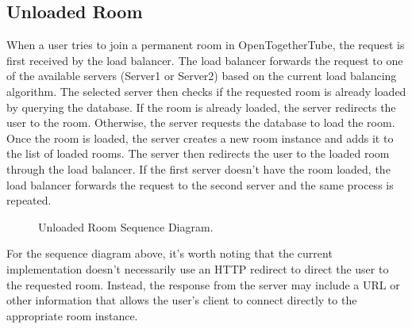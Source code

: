 \subsection{Unloaded Room}
When a user tries to join a permanent room in OpenTogetherTube, the request is first received by the load balancer. 
The load balancer forwards the request to one of the available servers (Server1 or Server2) based on the current load
balancing algorithm. The selected server then checks if the requested room is already loaded by querying the database. 
If the room is already loaded, the server redirects the user to the room. Otherwise, the server requests the database to 
load the room. Once the room is loaded, the server creates a new room instance and adds it to the list of loaded rooms. 
The server then redirects the user to the loaded room through the load balancer. If the first server doesn't have the
room loaded, the load balancer forwards the request to the second server and the same process is repeated.

 \begin{figure}[!htb]
  \centering
  \caption{\label{Figure::unloaded-room} Unloaded Room Sequence Diagram.}
\end{figure}

For the sequence diagram above, it's worth noting that the current implementation doesn't necessarily use an HTTP 
redirect to direct the user to the requested room. Instead, the response from the server may include a URL or other
information that allows the user's client to connect directly to the appropriate room instance.